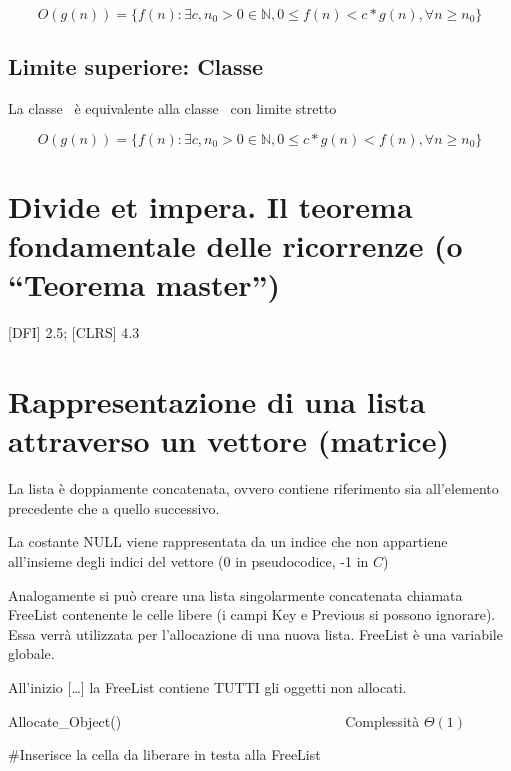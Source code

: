 \documentclass[11pt,a4paper,twoside,openright]{book}
\begin{document}
{{\begin{equation}
O(g(n)) = \{f(n) : \exists c,n_0 > 0 \in \mathbb{N}, 0 \leq f(n) < c*g(n), \forall n \geq n_0 \}
\end{equation}

\subsection{Limite superiore: Classe \omega}

La classe \omega\, è equivalente alla classe \Omega\, con limite stretto

\begin{equation}
O(g(n)) = \{f(n) : \exists c,n_0 > 0 \in \mathbb{N}, 0 \leq c*g(n) < f(n), \forall n \geq n_0 \}
\end{equation}

\section{Divide et impera. Il teorema fondamentale delle ricorrenze (o ``Teorema master'')}

{{[}DFI{]} 2.5; {[}CLRS{]} 4.3}

\section{Rappresentazione di una lista attraverso un vettore (matrice)}

{La lista è doppiamente concatenata, ovvero contiene riferimento sia all'elemento precedente che a quello successivo.}

{La costante NULL viene rappresentata da un indice che non appartiene all'insieme degli indici del vettore (0 in pseudocodice, -1 in $C$)}



{Analogamente si può creare una lista singolarmente concatenata chiamata FreeList contenente le celle libere (i campi Key e Previous si possono ignorare). Essa verrà utilizzata per l'allocazione di una nuova lista. FreeList è una variabile globale.}

{All'inizio {[}\ldots{}{]} la FreeList contiene TUTTI gli oggetti non allocati.}

{Allocate\_Object()~~~~~~~~~~~~~~~~~~~~~~~~~~~~~~~~}{Complessità $\Theta(1)$}



{\#Inserisce la cella da liberare in testa alla FreeList}

}}
\end{document}
